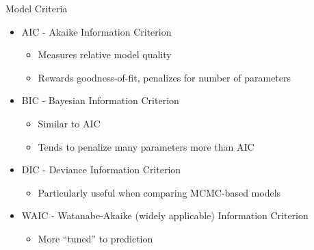 \documentclass[11pt,compress,aspectratio=1610]{beamer}
\begin{document}
\begin{frame}{Model Criteria}
\begin{itemize}
	\item AIC - Akaike Information Criterion
	\begin{itemize}
		\item Measures relative model quality
		\item Rewards goodness-of-fit, penalizes for number of parameters
	\end{itemize}
	\item BIC - Bayesian Information Criterion
	\begin{itemize}
		\item Similar to AIC
		\item Tends to penalize many parameters more than AIC
	\end{itemize}
	\item DIC - Deviance Information Criterion
	\begin{itemize}
		\item Particularly useful when comparing MCMC-based models
	\end{itemize}
	\item WAIC - Watanabe-Akaike (widely applicable) Information Criterion
	\begin{itemize}
		\item More ``tuned'' to prediction
	\end{itemize}

\end{itemize}
\end{frame}


\begin{frame}[shrink=50]
\vspace{2\baselineskip}

\begin{multicols}{2}
\nocite{*}


\end{multicols}
\end{frame}






		
\end{document}
